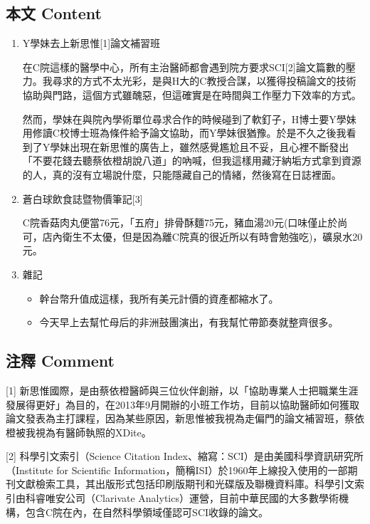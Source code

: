 \documentclass[a5paper, 10pt
]{book}
\providecommand{\tightlist}{%
  \setlength{\itemsep}{0pt}\setlength{\parskip}{0pt}}
\begin{document}
\hypertarget{ux672cux6587-content-4}{%
\subsection{本文 Content}\label{ux672cux6587-content-4}}

\begin{enumerate}
\def\labelenumi{\arabic{enumi}.}
\item
  Y學妹去上新思惟{[}1{]}論文補習班

  在C院這樣的醫學中心，所有主治醫師都會遇到院方要求SCI{[}2{]}論文篇數的壓力。我尋求的方式不太光彩，是與H大的C教授合謀，以獲得投稿論文的技術協助與門路，這個方式雖醜惡，但這確實是在時間與工作壓力下效率的方式。

  然而，學妹在與院內學術單位尋求合作的時候碰到了軟釘子，H博士要Y學妹用修讀C校博士班為條件給予論文協助，而Y學妹很猶豫。於是不久之後我看到了Y學妹出現在新思惟的廣告上，雖然感覺尷尬且不妥，且心裡不斷發出「不要花錢去聽蔡依橙胡說八道」的吶喊，但我這樣用藏汙納垢方式拿到資源的人，真的沒有立場說什麼，只能隱藏自己的情緒，然後寫在日誌裡面。
\item
  蒼白球飲食誌暨物價筆記{[}3{]}

  C院香菇肉丸便當76元，「五府」排骨酥麵75元，豬血湯20元(口味僅止於尚可，店內衛生不太優，但是因為離C院真的很近所以有時會勉強吃)，礦泉水20元。
\item
  雜記

  \begin{itemize}
  \tightlist
  \item
    幹台幣升值成這樣，我所有美元計價的資產都縮水了。
  \item
    今天早上去幫忙母后的非洲鼓團演出，有我幫忙帶節奏就整齊很多。
  \end{itemize}
\end{enumerate}

\hypertarget{ux6ce8ux91cb-comment-4}{%
\subsection{注釋 Comment}\label{ux6ce8ux91cb-comment-4}}

{[}1{]}
新思惟國際，是由蔡依橙醫師與三位伙伴創辦，以「協助專業人士把職業生涯發展得更好」為目的，在2013年9月開辦的小班工作坊，目前以協助醫師如何獲取論文發表為主打課程，因為某些原因，新思惟被我視為走偏門的論文補習班，蔡依橙被我視為有醫師執照的XDite。

{[}2{]} 科學引文索引（Science Citation
Index、縮寫：SCI）是由美國科學資訊研究所（Institute for Scientific
Information，簡稱ISI）於1960年上線投入使用的一部期刊文獻檢索工具，其出版形式包括印刷版期刊和光碟版及聯機資料庫。科學引文索引由科睿唯安公司（Clarivate
Analytics）運營，目前中華民國的大多數學術機構，包含C院在內，在自然科學領域僅認可SCI收錄的論文。
\end{document}
